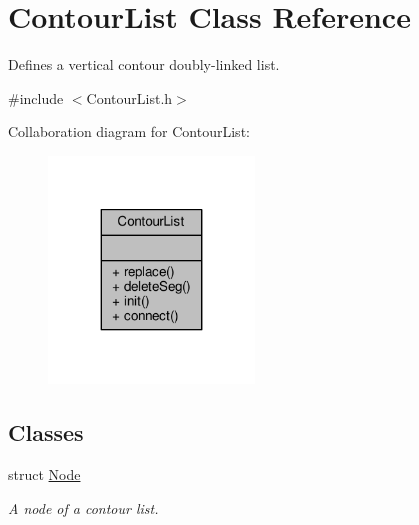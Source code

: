 \hypertarget{classContourList}{}\section{Contour\+List Class Reference}
\label{classContourList}


Defines a vertical contour doubly-\/linked list.  




{\ttfamily \#include $<$Contour\+List.\+h$>$}



Collaboration diagram for Contour\+List\+:
\nopagebreak
\begin{figure}[H]
\begin{center}
\leavevmode
\includegraphics[width=155pt]{classContourList__coll__graph}
\end{center}
\end{figure}
\subsection*{Classes}
\begin{DoxyCompactItemize}
\item 
struct \hyperlink{structContourList_1_1Node}{Node}
\begin{DoxyCompactList}\small\item\em A node of a contour list. \end{DoxyCompactList}\end{DoxyCompactItemize}
